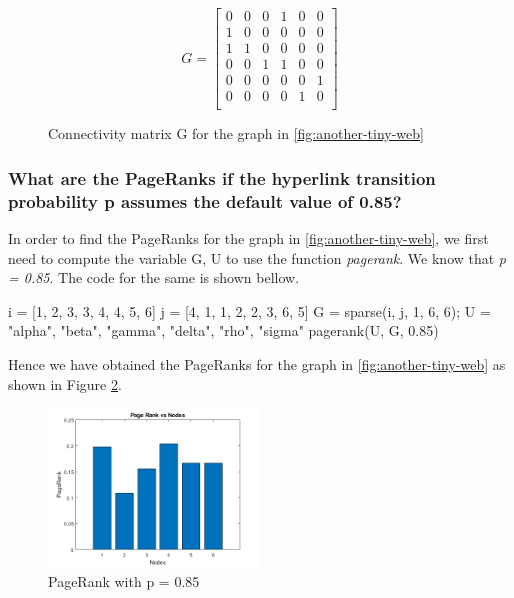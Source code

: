 \documentclass[unicode,11pt,a4paper,oneside,numbers=endperiod,openany]{scrartcl}
\begin{document}
\begin{figure}[H]
    \centering
    \[ G =
        \begin{bmatrix}
            0 & 0 & 0 & 1 & 0 & 0 \\
            1 & 0 & 0 & 0 & 0 & 0 \\
            1 & 1 & 0 & 0 & 0 & 0 \\
            0 & 0 & 1 & 1 & 0 & 0 \\
            0 & 0 & 0 & 0 & 0 & 1 \\
            0 & 0 & 0 & 0 & 1 & 0 \\
        \end{bmatrix}
    \]
    \caption{Connectivity matrix G for the graph in \ref{fig:another-tiny-web}
        \label{fig:connectivity-matrix}}
\end{figure}






\subsubsection{What are the PageRanks if the hyperlink transition probability p assumes the default value of 0.85?}
In order to find the PageRanks for the graph in \ref{fig:another-tiny-web}, we first need to compute the variable G, U to use the function \textit{pagerank}. We know that \textit{p = 0.85}. The code for the same is shown bellow. \\

\begin{mcode}
    i = [1, 2, 3, 3, 4, 4, 5, 6] %
    j = [4, 1, 1, 2, 2, 3, 6, 5] %
    G = sparse(i, j, 1, 6, 6); %
    U = {"alpha", "beta", "gamma", "delta", "rho", "sigma"} %
    pagerank(U, G, 0.85) %
\end{mcode}

Hence we have obtained the PageRanks for the graph in \ref{fig:another-tiny-web} as shown in Figure \ref{fig:pagerank-85}.\\

\begin{figure}[H]
    \centering
    \includegraphics[width=0.5\textwidth]{images/pagerank-85.jpg}
    \caption{PageRank with p = 0.85}
    \label{fig:pagerank-85}
\end{figure}
\end{document}
